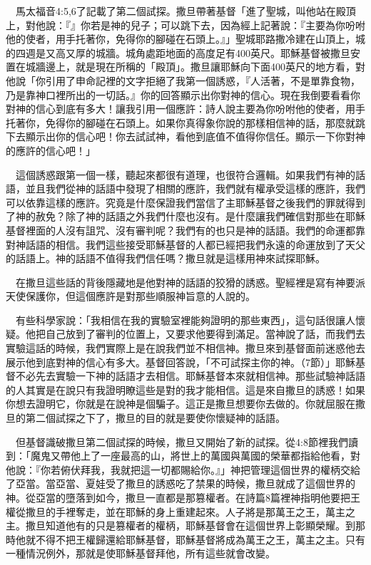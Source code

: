 \documentclass{book}
\begin{document}
　馬太福音4:5,6了記載了第二個試探。撒旦帶著基督「進了聖城，叫他站在殿頂上，對他說：『』你若是神的兒子；可以跳下去，因為經上記著說：『主要為你吩咐他的使者，用手托著你，免得你的腳碰在石頭上。』」聖城耶路撒冷建在山頂上，城的四週是又高又厚的城牆。城角處距地面的高度足有400英尺。耶穌基督被撒旦安置在城牆邊上，就是現在所稱的「殿頂」。撒旦讓耶穌向下面400英尺的地方看，對他說「你引用了申命記裡的文字拒絕了我第一個誘惑，『人活著，不是單靠食物，乃是靠神口裡所出的一切話。』你的回答顯示出你對神的信心。現在我倒要看看你對神的信心到底有多大！讓我引用一個應許：詩人說主要為你吩咐他的使者，用手托著你，免得你的腳碰在石頭上。如果你真得象你說的那樣相信神的話，那麼就跳下去顯示出你的信心吧！你去試試神，看他到底值不值得你信任。顯示一下你對神的應許的信心吧！」

　這個誘惑跟第一個一樣，聽起來都很有道理，也很符合邏輯。如果我們有神的話語，並且我們從神的話語中發現了相關的應許，我們就有權承受這樣的應許，我們可以依靠這樣的應許。究竟是什麼保證我們當信了主耶穌基督之後我們的罪就得到了神的赦免？除了神的話語之外我們什麼也沒有。是什麼讓我們確信對那些在耶穌基督裡面的人沒有詛咒、沒有審判呢？我們有的也只是神的話語。我們的命運都靠對神話語的相信。我們這些接受耶穌基督的人都已經把我們永遠的命運放到了天父的話語上。神的話語不值得我們信任嗎？撒旦就是這樣用神來試探耶穌。

　在撒旦這些話的背後隱藏地是他對神的話語的狡猾的誘惑。聖經裡是寫有神要派天使保護你，但這個應許是對那些順服神旨意的人說的。

　有些科學家說：「我相信在我的實驗室裡能夠證明的那些東西」，這句話很讓人懷疑。他把自己放到了審判的位置上，又要求他要得到滿足。當神說了話，而我們去實驗這話的時候，我們實際上是在說我們並不相信神。撒旦來到基督面前迷惑他去展示他到底對神的信心有多大。基督回答說，「不可試探主你的神。（7節）」耶穌基督不必先去實驗一下神的話語才去相信。耶穌基督本來就相信神。那些試驗神話語的人其實是在說只有我證明瞭這些是對的我才能相信。這是來自撒旦的誘惑！如果你想去證明它，你就是在說神是個騙子。這正是撒旦想要你去做的。你就屈服在撒旦的第二個試探之下了，撒旦的目的就是要使你懷疑神的話語。

　但基督識破撒旦第二個試探的時候，撒旦又開始了新的試探。從4:8節裡我們讀到：「魔鬼又帶他上了一座最高的山，將世上的萬國與萬國的榮華都指給他看，對他說：『你若俯伏拜我，我就把這一切都賜給你。』」神把管理這個世界的權柄交給了亞當。當亞當、夏娃受了撒旦的誘惑吃了禁果的時候，撒旦就成了這個世界的神。從亞當的墮落到如今，撒旦一直都是那篡權者。在詩篇8篇裡神指明他要把王權從撒旦的手裡奪走，並在耶穌的身上重建起來。人子將是那萬王之王，萬主之主。撒旦知道他有的只是篡權者的權柄，耶穌基督會在這個世界上彰顯榮耀。到那時他就不得不把王權歸還給耶穌基督，耶穌基督將成為萬王之王，萬主之主。只有一種情況例外，那就是使耶穌基督拜他，所有這些就會改變。
\end{document}
